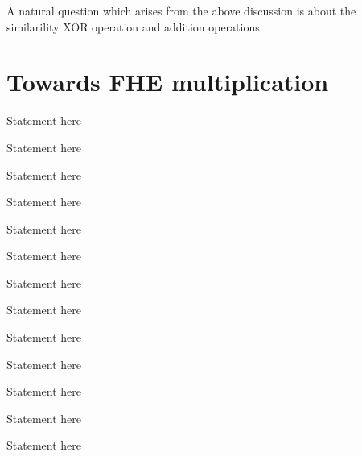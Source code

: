 \documentclass[usletter]{article}
\begin{document}
\begin{remark}
A natural question which arises from the above discussion is about the similarility XOR operation 
and addition operations.   
\end{remark}

\section{Towards FHE multiplication}

\begin{theorem}
Statement here 
\end{theorem}

\begin{lemma}
Statement here
\end{lemma}

\begin{corollary}
Statement here
\end{corollary}

\begin{proposition}
Statement here
\end{proposition}

\begin{fact}
Statement here
\end{fact}

\begin{claim}
Statement here
\end{claim}

\begin{definition}
Statement here
\end{definition}

\begin{example}
Statement here
\end{example}

\begin{assumption}
Statement here
\end{assumption}

\begin{remark}
Statement here
\end{remark}

\begin{conjecture}
Statement here
\end{conjecture}

\begin{openproblem}
Statement here
\end{openproblem}

\begin{problem}
Statement here
\end{problem}
\end{document}
